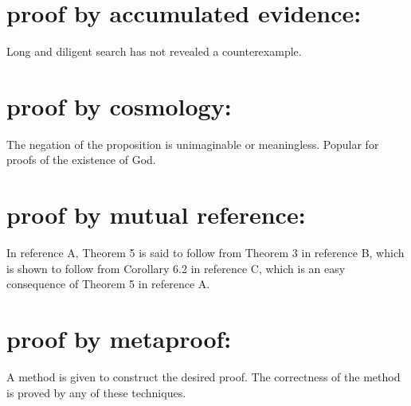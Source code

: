 \setcounter{equation}{0} 

\section{proof by accumulated evidence:}

	Long and diligent search has not revealed a counterexample.

\section{proof by cosmology:}

	The negation of the proposition is unimaginable or
	meaningless. Popular for proofs of the existence of God.

\section{proof by mutual reference:}

	In reference A, Theorem 5 is said to follow from Theorem 3 in
	reference B, which is shown to follow from Corollary 6.2 in
	reference C, which is an easy consequence of Theorem 5 in
	reference A.

\section{proof by metaproof:}

	A method is given to construct the desired proof. The
	correctness of the method is proved by any of these
	techniques.